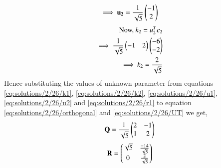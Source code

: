\begin{align}
\implies\mathbf{u_2} = \frac{1}{\sqrt{5}}\begin{pmatrix}-1\\2\end{pmatrix}\label{eq:solutions/2/26/u2}
\end{align}
\begin{align}
\mbox{Now, } k_2 = u_2^Tc_2\\
\implies \frac{1}{\sqrt{5}}\begin{pmatrix}-1&2\end{pmatrix}\begin{pmatrix}-6\\-2\end{pmatrix}\\\implies k_2 = \frac{2}{\sqrt{5}} \label{eq:solutions/2/26/k2}
\end{align}
Hence substituting the values of unknown parameter from equations \eqref{eq:solutions/2/26/k1}, \eqref{eq:solutions/2/26/k2}, \eqref{eq:solutions/2/26/u1}, \eqref{eq:solutions/2/26/u2} and \eqref{eq:solutions/2/26/r1} to equation \eqref{eq:solutions/2/26/orthogonal} and \eqref{eq:solutions/2/26/UT} we get,
\begin{align}
\mathbf{Q} = \frac{1}{\sqrt{5}}\begin{pmatrix}2&-1\\1&2\end{pmatrix}
\end{align} 
\begin{align}
\mathbf{R} = \begin{pmatrix}\sqrt{5}&\frac{-14}{\sqrt{5}}\\0&\frac{2}{\sqrt{5}}\end{pmatrix}
\end{align}
